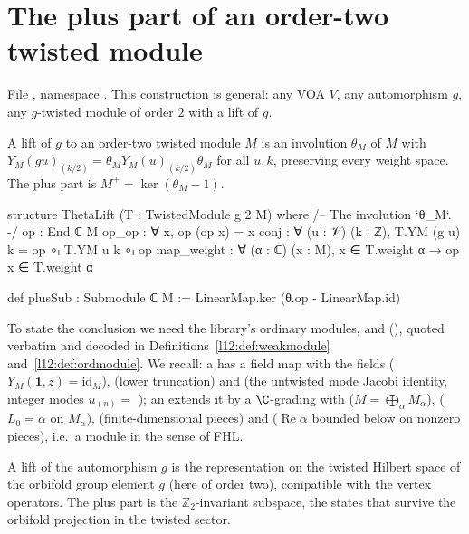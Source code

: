 \section{The plus part of an order-two twisted module}\label{ch08:sec:plus}

File , namespace .  This
construction is general: any VOA $V$, any automorphism $g$, any $g$-twisted module of order $2$
with a lift of $g$.

\begin{definition}[Lift of $g$]\label{ch08:def:ThetaLift}
A lift of $g$ to an order-two twisted module $M$ is an involution $\theta_M$ of $M$ with
$Y_M(gu)_{(k/2)}=\theta_MY_M(u)_{(k/2)}\theta_M$ for all $u,k$, preserving every weight space.
The plus part is $M^+=\ker(\theta_M-1)$.
\end{definition}
\begin{leancode}
structure ThetaLift (T : TwistedModule g 2 M) where
  /-- The involution `θ_M`. -/
  op : End ℂ M
  op_op : ∀ x, op (op x) = x
  conj : ∀ (u : 𝒱) (k : ℤ), T.YM (g u) k = op ∘ₗ T.YM u k ∘ₗ op
  map_weight : ∀ (α : ℂ) (x : M), x ∈ T.weight α → op x ∈ T.weight α

def plusSub : Submodule ℂ M := LinearMap.ker (θ.op - LinearMap.id)
\end{leancode}

To state the conclusion we need the library's ordinary modules,  and
 (), quoted verbatim and decoded in
Definitions~\ref{l12:def:weakmodule} and~\ref{l12:def:ordmodule}.  We recall: a
 has a field map  with the fields
 ($Y_M(\mathbf 1,z)=\mathrm{id}_M$),  (lower truncation) and
 (the untwisted mode Jacobi identity, integer modes $u_{(n)}=$
); an  extends it by a $\C$-grading  with
 ($M=\bigoplus_\alpha M_\alpha$),  ($L_0=\alpha$ on $M_\alpha$),
 (finite-dimensional pieces) and  ($\operatorname{Re}\alpha$
bounded below on nonzero pieces), i.e.\ a module in the sense of FHL.

\begin{physics}
A lift of the automorphism $g$ is the representation on the twisted Hilbert space of the orbifold group element $g$ (here of order two), compatible with the vertex operators. The plus part is the $\mathbb Z_2$-invariant subspace, the states that survive the orbifold projection in the twisted sector.
\end{physics}

